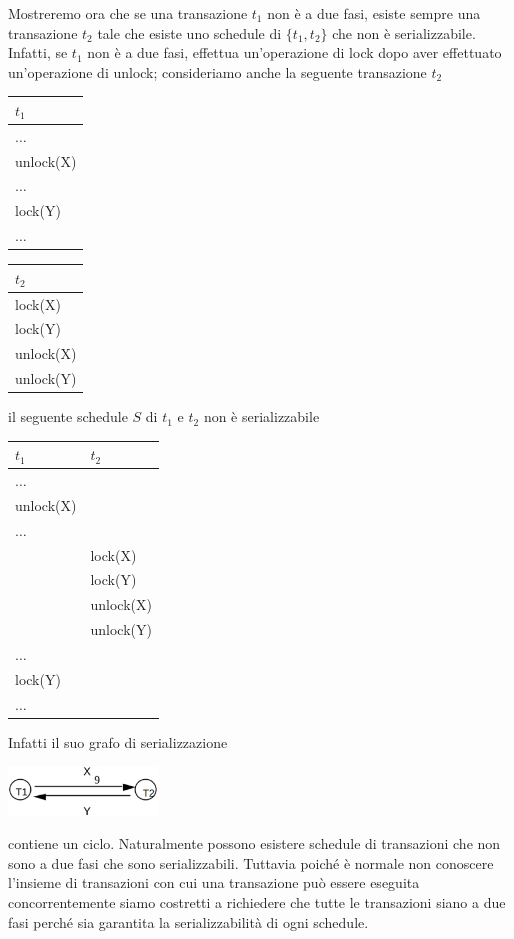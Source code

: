 Mostreremo ora che se una transazione $t_1$ non è a due fasi, esiste sempre una transazione $t_2$ tale
che esiste uno schedule di $\{t_1, t_2\}$ che non è serializzabile. Infatti, se $t_1$ non è a due fasi, effettua
un'operazione di lock dopo aver effettuato un'operazione di unlock; consideriamo anche la seguente transazione $t_2$  

\begin{multicols}{2}  

 \begin{tabular}{|l|}
   \hline
   $t_1$\\
   \hline
   $\ldots$\\
   unlock(X)\\ 
   $\ldots$\\
   lock(Y)\\ 
   $\ldots$\\
  \hline
 \end{tabular}
 
 \begin{tabular}{|l|}
  \hline
   $t_2$\\
   \hline
   lock(X)\\
   lock(Y)\\
   unlock(X)\\
   unlock(Y)\\
  \hline
  \end{tabular} 
 \end{multicols}
 

 il seguente schedule $S$ di $t_1$ e $t_2$ non è serializzabile
\begin{center}
 \begin{tabular}{|l|l|}
 \hline
 $t_1$ & $t_2$\\
 \hline
   $\ldots$&\\
   unlock(X)&\\
   $\ldots$&\\
   &lock(X)\\
   &lock(Y)\\
   &unlock(X)\\    
   &unlock(Y)\\
   $\ldots$&\\
   lock(Y)&\\
   $\ldots$&\\
   \hline
  \end{tabular}
\end{center}

Infatti il suo grafo di serializzazione
\begin{center}
  \includegraphics[width=150px]{img_6_3_1.eps}
\end{center}
contiene un ciclo. Naturalmente possono esistere schedule di transazioni che non sono a due fasi
che sono serializzabili. Tuttavia poiché è normale non conoscere l'insieme di transazioni con cui
una transazione può essere eseguita concorrentemente siamo costretti a richiedere che tutte le
transazioni siano a due fasi perché sia garantita la serializzabilità di ogni schedule.

